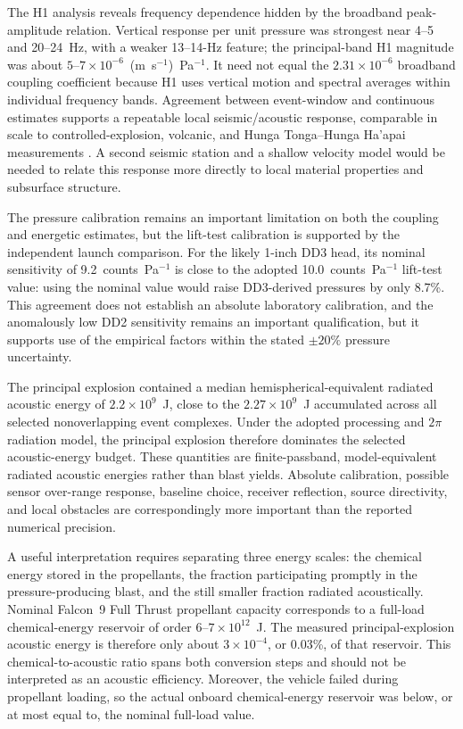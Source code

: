 \documentclass[]{seismica}
\begin{document}
The H1 analysis reveals frequency dependence hidden by the broadband
peak-amplitude relation. Vertical response per unit pressure was strongest near
4--5 and 20--24~Hz, with a weaker 13--14-Hz feature; the principal-band H1
magnitude was about
$5$--$7\times10^{-6}$~(m~s$^{-1}$)~Pa$^{-1}$. It need not equal the
$2.31\times10^{-6}$ broadband coupling coefficient because H1 uses vertical
motion and spectral averages within individual frequency bands. Agreement
between event-window and continuous estimates supports a repeatable local
seismic/acoustic response, comparable in scale to controlled-explosion,
volcanic, and Hunga Tonga--Hunga Ha'apai measurements
\citep{novoselov_ground_coupling_2020,anthony_hunga_coupling_2023,
macpherson_hunga_coupling_2025}. A second seismic station and a shallow
velocity model would be needed to relate this response more directly to local
material properties and subsurface structure.

The pressure calibration remains an important limitation on both the
coupling and energetic estimates, but the lift-test calibration is supported
by the independent launch comparison. For the likely 1-inch DD3 head, its
nominal sensitivity of 9.2~counts~Pa$^{-1}$ is close to the adopted
10.0~counts~Pa$^{-1}$ lift-test value: using the nominal value would raise
DD3-derived pressures by only 8.7\%. This agreement does not establish an
absolute laboratory calibration, and the anomalously low DD2 sensitivity
remains an important qualification, but it supports use of the empirical
factors within the stated $\pm20\%$ pressure uncertainty.

The principal explosion contained a median hemispherical-equivalent radiated
acoustic energy of $2.2\times10^9$~J, close to the
$2.27\times10^9$~J accumulated across all selected nonoverlapping event
complexes. Under the adopted processing and $2\pi$ radiation model, the
principal explosion therefore dominates the selected acoustic-energy budget.
These quantities are finite-passband, model-equivalent radiated acoustic
energies rather than blast yields. Absolute calibration, possible sensor
over-range response, baseline choice, receiver reflection, source directivity,
and local obstacles are correspondingly more important than the reported
numerical precision.

A useful interpretation requires separating three energy scales:
the chemical energy stored in the propellants, the fraction participating
promptly in the pressure-producing blast, and the still smaller fraction
radiated acoustically. Nominal Falcon~9 Full Thrust propellant capacity
corresponds to a full-load chemical-energy reservoir of order
$6$--$7\times10^{12}$~J. The measured principal-explosion acoustic energy is
therefore only about $3\times10^{-4}$, or 0.03\%, of that reservoir. This
chemical-to-acoustic ratio spans both conversion steps and should not be
interpreted as an acoustic efficiency. Moreover, the vehicle failed during
propellant loading, so the actual onboard chemical-energy reservoir was below,
or at most equal to, the nominal full-load value.
\end{document}
